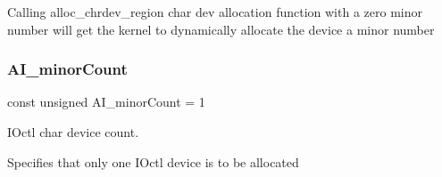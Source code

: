 Calling alloc\+\_\+chrdev\+\_\+region char dev allocation function with a zero minor number will get the kernel to dynamically allocate the device a minor number \mbox{\label{group__IOctl__maj__min_ga4a9b77eb24590cec68a0b899808b608f}} 
\subsubsection{\texorpdfstring{A\+I\+\_\+minor\+Count}{AI\_minorCount}}
{\footnotesize\ttfamily const unsigned A\+I\+\_\+minor\+Count = 1}



I\+Octl char device count. 

Specifies that only one I\+Octl device is to be allocated 